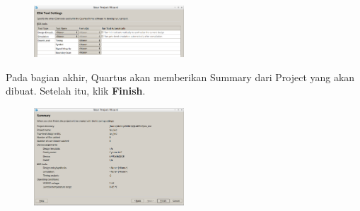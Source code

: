 \begin{figure}[H]
\centering
\includegraphics[width=0.5\textwidth]{images/NewProjectWizard_6.png}
\par
\end{figure}

Pada bagian akhir, Quartus akan memberikan Summary dari Project yang akan
dibuat. Setelah itu, klik \textbf{Finish}.
\begin{figure}[H]
\centering
\includegraphics[width=0.5\textwidth]{images/NewProjectWizard_7.png}
\par
\end{figure}


